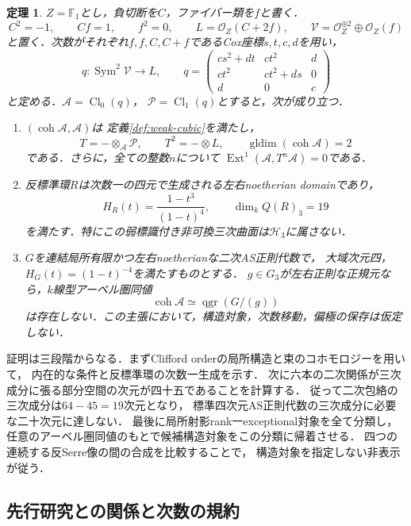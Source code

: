 \documentclass[11pt,a4paper]{ltjsarticle}
\newtheorem{theorem}{定理}[section]
\theoremstyle{definition}
\begin{document}
\begin{theorem}\label{thm:main}
$Z=\mathbb F_1$とし，負切断を$C$，ファイバー類を$f$と書く．
\[
 C^2=-1,\qquad C f=1,\qquad f^2=0,\qquad
 L=\mathcal O_Z(C+2f),\qquad
 \mathcal V=\mathcal O_Z^{\oplus2}\oplus\mathcal O_Z(f)
\]
と置く．次数がそれぞれ$f,f,C,C+f$であるCox座標$s,t,c,d$を用い，
\[
 q:\operatorname{Sym}^2\mathcal V\longrightarrow L,
 \qquad
 q=\begin{pmatrix}
 cs^2+dt&ct^2&d\\
 ct^2&ct^2+ds&0\\
 d&0&c
 \end{pmatrix}
\]
と定める．$\mathcal A=\operatorname{Cl}_0(q)$，
$\mathcal P=\operatorname{Cl}_1(q)$とすると，次が成り立つ．
\begin{enumerate}[label=(\roman*)]
\item $(\operatorname{coh}\mathcal A,\mathcal A)$は
定義\ref{def:weak-cubic}を満たし，
\[
 T=-\otimes_{\mathcal A}\mathcal P,\qquad T^2=-\otimes L,
 \qquad \operatorname{gldim}(\operatorname{coh}\mathcal A)=2
\]
である．さらに，全ての整数$n$について
$\operatorname{Ext}^1(\mathcal A,T^n\mathcal A)=0$である．
\item 反標準環$R$は次数一の四元で生成される左右noetherian domainであり，
\[
 H_R(t)=\frac{1-t^3}{(1-t)^4},\qquad \dim_k Q(R)_3=19
\]
を満たす．特にこの弱標識付き非可換三次曲面は$\mathcal H_3$に属さない．
\item $G$を連結局所有限かつ左右noetherianな二次AS正則代数で，
大域次元四，$H_G(t)=(1-t)^{-4}$を満たすものとする．
$g\in G_3$が左右正則な正規元なら，$k$線型アーベル圏同値
\[
 \operatorname{coh}\mathcal A\simeq\operatorname{qgr}(G/(g))
\]
は存在しない．この主張において，構造対象，次数移動，偏極の保存は仮定しない．
\end{enumerate}
\end{theorem}

証明は三段階からなる．まずClifford orderの局所構造と束のコホモロジーを用いて，
内在的な条件と反標準環の次数一生成を示す．
次に六本の二次関係が三次成分に張る部分空間の次元が四十五であることを計算する．
従って二次包絡の三次成分は$64-45=19$次元となり，
標準四次元AS正則代数の三次成分に必要な二十次元に達しない．
最後に局所射影rank一exceptional対象を全て分類し，
任意のアーベル圏同値のもとで候補構造対象をこの分類に帰着させる．
四つの連続する反Serre像の間の合成を比較することで，
構造対象を指定しない非表示が従う．

\subsection{先行研究との関係と次数の規約}
\end{document}
